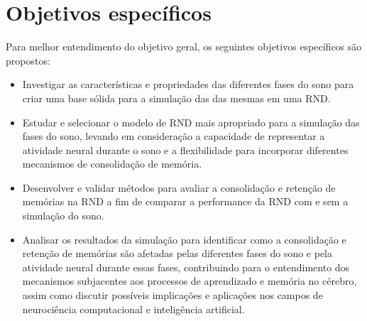 \section{Objetivos específicos}

Para melhor entendimento do objetivo geral, os seguintes objetivos específicos são propostos:

\begin{itemize}

  \item Investigar as características e propriedades das diferentes fases do sono para criar uma base sólida para a simulação das
das mesmas em uma RND.\@

  \item Estudar e selecionar o modelo de RND mais apropriado para a simulação das fases do sono, levando em consideração a
capacidade de representar a atividade neural durante o sono e a flexibilidade para incorporar diferentes mecanismos de
consolidação de memória.

  \item Desenvolver e validar métodos para avaliar a consolidação e retenção de memórias na RND a fim de comparar a performance da
  RND com e sem a simulação do sono.

  \item  Analisar os resultados da simulação para identificar como a consolidação e retenção de memórias são afetadas pelas
diferentes fases do sono e pela atividade neural durante essas fases, contribuindo para o entendimento dos mecanismos subjacentes
aos processos de aprendizado e memória no cérebro, assim como discutir possíveis implicações e aplicações nos campos de
neurociência computacional e inteligência artificial.

\end{itemize}


